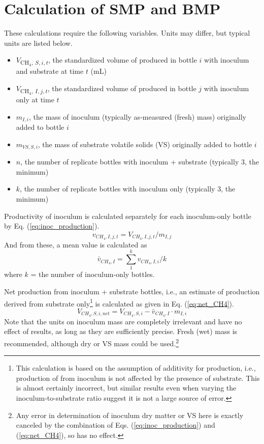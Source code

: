 \documentclass[]{article}
\begin{document}
\section{Calculation of SMP and BMP}
These calculations require the following variables.
Units may differ, but typical units are listed below.
\begin{itemize}
  \item $V$\textsubscript{{CH$_4$, $S, i, t$}}, the standardized volume of  produced in bottle $i$ with inoculum and substrate at time $t$ (mL)
  \item $V$\textsubscript{{CH$_4$, $I, j, t$}}, the standardized volume of  produced in bottle $j$ with inoculum only at time $t$
  \item $m_{I, i}$, the mass of inoculum (typically as-measured (fresh) mass) originally added to bottle $i$
  \item $m_{VS, S, i}$, the mass of substrate volatile solids (VS) originally added to bottle $i$
  \item $n$, the number of replicate bottles with inoculum + substrate (typically 3, the minimum)
  \item $k$, the number of replicate bottles with inoculum only (typically 3, the minimum)
\end{itemize}

Productivity of inoculum is calculated separately for each inoculum-only bottle by Eq. (\ref{eq:inoc_production}).
\begin{equation}
  \label{eq:inoc_production}
  v_{CH_4, I, j, t} = V_{CH_4, I, j, t} / m_{I, j} 
\end{equation}
And from these, a mean value is calculated as 
\begin{equation}
  \label{eq:inoc_productivity}
  \bar{v}_{CH_4, I} = \sum_1 ^k v_{CH_4, I, i} / k
\end{equation}
where $k$ = the number of inoculum-only bottles.

Net  production from inoculum + substrate bottles, i.e., an estimate of  production derived from substrate only\footnote{This calculation is based on the assumption of additivity for  production, i.e., production of  from inoculum is not affected by the presence of substrate. This is almost certainly incorrect, but similar results even when varying the inoculum-to-substrate ratio suggest it is not a large source of error.} is calculated as given in Eq. (\ref{eq:net_CH4}).
\begin{equation}
  \label{eq:net_CH4}
  V_{CH_4, S, i, net} = V_{CH_4, S, i} - \bar{v}_{CH_4, I} \cdot m_{I, i}
\end{equation}
Note that the units on inoculum mass are completely irrelevant and have no effect of results, as long as they are sufficiently precise.
Fresh (wet) mass is recommended, although dry or VS mass could be used.\footnote{Any error in determination of inoculum dry matter or VS here is exactly canceled by the combination of Eqs. (\ref{eq:inoc_production}) and (\ref{eq:net_CH4}), so has no effect.}
\end{document}

